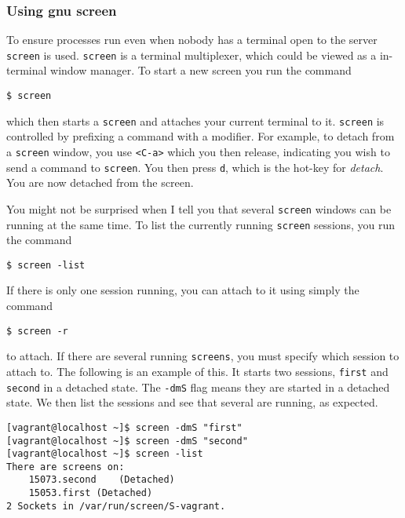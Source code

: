 \subsubsection{Using gnu screen}\label{sec:using-gnu-screen}

To ensure processes run even when nobody has a terminal open to the
server \texttt{screen} is used. \texttt{screen} is a terminal
multiplexer, which could be viewed as a in-terminal window manager. To
start a new screen you run the command

\begin{verbatim}
$ screen
\end{verbatim}

which then starts a \texttt{screen} and attaches your current terminal
to it. \texttt{screen} is controlled by prefixing a command with a
modifier. For example, to detach from a \texttt{screen} window, you use
\texttt{\textless{}C-a\textgreater{}} which you then release, indicating
you wish to send a command to \texttt{screen}. You then press
\texttt{d}, which is the hot-key for \emph{detach}. You are now detached
from the screen.

You might not be surprised when I tell you that several \texttt{screen}
windows can be running at the same time. To list the currently running
\texttt{screen} sessions, you run the command

\begin{verbatim}
$ screen -list
\end{verbatim}

If there is only one session running, you can attach to it using simply
the command

\begin{verbatim}
$ screen -r
\end{verbatim}

to attach. If there are several running \texttt{screens}, you must
specify which session to attach to. The following is an example of this.
It starts two sessions, \texttt{first} and \texttt{second} in a detached
state. The \texttt{-dmS} flag means they are started in a detached
state. We then list the sessions and see that several are running, as
expected.

\begin{verbatim}
[vagrant@localhost ~]$ screen -dmS "first"
[vagrant@localhost ~]$ screen -dmS "second"
[vagrant@localhost ~]$ screen -list
There are screens on:
    15073.second    (Detached)
    15053.first (Detached)
2 Sockets in /var/run/screen/S-vagrant.
\end{verbatim}

